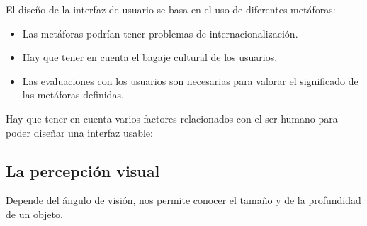 \documentclass[12pt, twoside, openright]{report} %
\begin{document}
	El diseño de la interfaz de usuario se basa en el uso de diferentes
    metáforas:

    \begin{itemize}
    
    \item
      Las metáforas podrían tener problemas de internacionalización.
    \item
      Hay que tener en cuenta el bagaje cultural de los usuarios.
    \item
      Las evaluaciones con los usuarios son necesarias para valorar el
      significado de las metáforas definidas.
    \end{itemize}

	Hay que tener en cuenta varios factores relacionados con el ser
    humano para poder diseñar una interfaz usable:

    
\subsection{La percepción visual}
Depende del ángulo de visión, nos permite
      conocer el tamaño y de la profundidad de un objeto.
\end{document}

